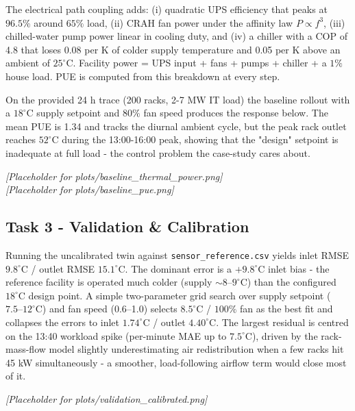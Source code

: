 \documentclass[letterpaper,11pt]{article}
\begin{document}
	The electrical path coupling adds: (i) quadratic UPS efficiency that peaks at $96.5\%$ around $65\%$ load, (ii) CRAH fan power under the affinity law $P \propto f^3$, (iii) chilled-water pump power linear in cooling duty, and (iv) a chiller with a COP of 4.8 that loses 0.08 per K of colder supply temperature and 0.05 per K above an ambient of $25^\circ\text{C}$. Facility power = UPS input + fans + pumps + chiller + a $1\%$ house load. PUE is computed from this breakdown at every step.
	
	On the provided 24 h trace (200 racks, 2-7 MW IT load) the baseline rollout with a $18^\circ\text{C}$ supply setpoint and $80\%$ fan speed produces the response below. The mean PUE is 1.34 and tracks the diurnal ambient cycle, but the peak rack outlet reaches $52^\circ\text{C}$ during the 13:00-16:00 peak, showing that the "design" setpoint is inadequate at full load - the control problem the case-study cares about.
	
	\begin{center}
		\textit{[Placeholder for plots/baseline\_thermal\_power.png]} \\
		\vspace{2pt}
		\textit{[Placeholder for plots/baseline\_pue.png]}
	\end{center}
	
	\subsection{Task 3 - Validation \& Calibration}
	Running the uncalibrated twin against \texttt{sensor\_reference.csv} yields inlet RMSE $9.8^\circ\text{C}$ / outlet RMSE $15.1^\circ\text{C}$. The dominant error is a $+9.8^\circ\text{C}$ inlet bias - the reference facility is operated much colder (supply $\sim 8\text{--}9^\circ\text{C}$) than the configured $18^\circ\text{C}$ design point. A simple two-parameter grid search over supply setpoint ($7.5\text{--}12^\circ\text{C}$) and fan speed (0.6--1.0) selects $8.5^\circ\text{C}$ / $100\%$ fan as the best fit and collapses the errors to inlet $1.74^\circ\text{C}$ / outlet $4.40^\circ\text{C}$. The largest residual is centred on the 13:40 workload spike (per-minute MAE up to $7.5^\circ\text{C}$), driven by the rack-mass-flow model slightly underestimating air redistribution when a few racks hit 45 kW simultaneously - a smoother, load-following airflow term would close most of it.
	
	\begin{center}
		\textit{[Placeholder for plots/validation\_calibrated.png]}
	\end{center}
	
\end{document}
